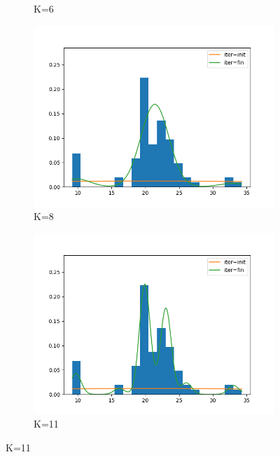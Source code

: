 \begin{figure}
\begin{subfigure}[b]{0.3\textwidth}
         \caption{K=6}
         \label{fig:Reg_loc_only6}
     \end{subfigure}
     \hfill
     \begin{subfigure}[b]{0.3\textwidth}
         \centering
         \includegraphics[width=\textwidth]{../code/regular_loc_only_plots/galaxies_hist_k_8.png}
         \caption{K=8}
         \label{fig:Reg_loc_only8}
     \end{subfigure}
     \begin{subfigure}[b]{0.3\textwidth}
         \centering
         \includegraphics[width=\textwidth]{../code/regular_loc_only_plots/galaxies_hist_k_11.png}
         \caption{K=11}
         \label{fig:Reg_loc_only11}
     \end{subfigure}

\end{figure}
